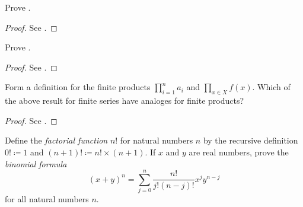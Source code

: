\exercisesection

\begin{ex}\label{i:ex:7.1.1}
  Prove .
\end{ex}

\begin{proof}
  See .
\end{proof}

\begin{ex}\label{i:ex:7.1.2}
  Prove .
\end{ex}

\begin{proof}
  See .
\end{proof}

\begin{ex}\label{i:ex:7.1.3}
  Form a definition for the finite products \(\prod_{i = 1}^n a_i\) and \(\prod_{x \in X} f(x)\).
  Which of the above result for finite series have analoges for finite products?
\end{ex}

\begin{proof}
  See .
\end{proof}

\begin{ex}\label{i:ex:7.1.4}
  Define the \emph{factorial function} \(n!\) for natural numbers \(n\) by the recursive definition \(0! \coloneqq 1\) and \((n + 1)! \coloneqq n! \times (n + 1)\).
  If \(x\) and \(y\) are real numbers, prove the \emph{binomial formula}
  \[
    (x + y)^n = \sum_{j = 0}^n \dfrac{n!}{j!(n - j)!} x^j y^{n - j}
  \]
  for all natural numbers \(n\).
\end{ex}


